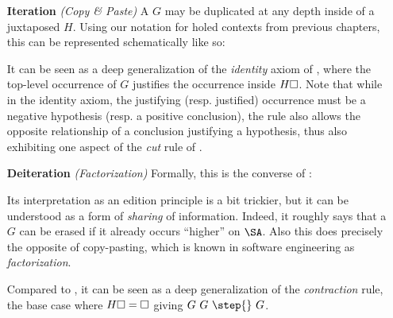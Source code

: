 \begin{itemize}
  \item[\textbf{Iteration} \textit{(Copy \& Paste)}]
    A  $G$ may be duplicated at any depth inside of a juxtaposed  $H$.
    Using our notation for holed contexts from previous chapters, this can be
    represented schematically like so:
    It can be seen as a deep generalization of the \emph{identity} axiom of
    , where the top-level occurrence of $G$ justifies the
    occurrence inside $H\square$. Note that while in the identity axiom, the justifying
    (resp. justified) occurrence must be a negative hypothesis (resp. a positive
    conclusion), the  rule also allows the opposite relationship
    of a conclusion justifying a hypothesis, thus also exhibiting one aspect of
    the \emph{cut} rule of .
  \item[\textbf{Deiteration} \textit{(Factorization)}]
    Formally, this is the converse of :
    Its interpretation as an edition principle is a bit trickier, but it can be
    understood as a form of \emph{sharing} of information. Indeed, it roughly
    says that a  $G$ can be erased if it already occurs ``higher'' on
    $\SA$. Also this does precisely the opposite of copy-pasting, which is known
    in software engineering as \emph{factorization}.
    
    Compared to , it can be seen as a deep generalization of the
    \emph{contraction} rule, the base case where $H\square = \square$ giving $G~G
    ~\step{}~ G$.
\end{itemize}
